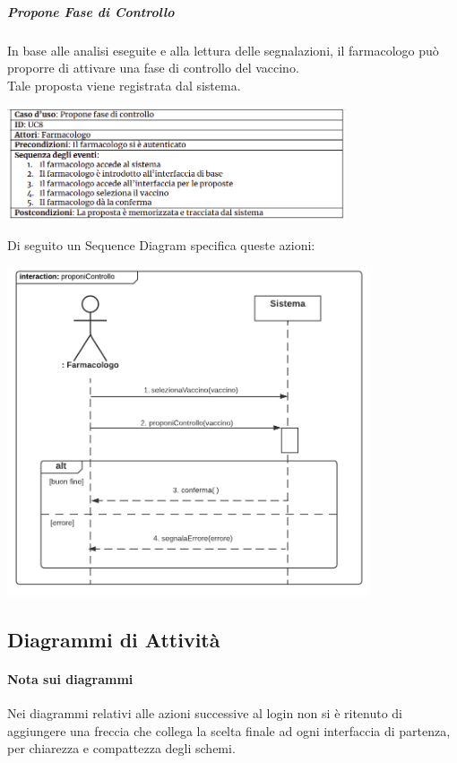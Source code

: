 \documentclass{article}
\begin{document}
\newpage
\subparagraph*{Propone Fase di Controllo}
In base alle analisi eseguite e alla lettura delle segnalazioni, il farmacologo può proporre di attivare una fase di controllo del vaccino.\\
Tale proposta viene registrata dal sistema.
\begin{center}
    \includegraphics[width=0.75\textwidth]{pictures/UC8.png}
\end{center}
Di seguito un Sequence Diagram specifica queste azioni:
\begin{center}
    \includegraphics[width=0.80\textwidth]{pictures/SDFarmacolo2_proponeControllo.png}
\end{center}

\newpage
\subsection{Diagrammi di Attività}
\paragraph*{Nota sui diagrammi}
Nei diagrammi relativi alle azioni successive al login non si è ritenuto di aggiungere una freccia che collega la scelta finale ad ogni interfaccia di partenza, per chiarezza e compattezza degli schemi.\\
\end{document}
